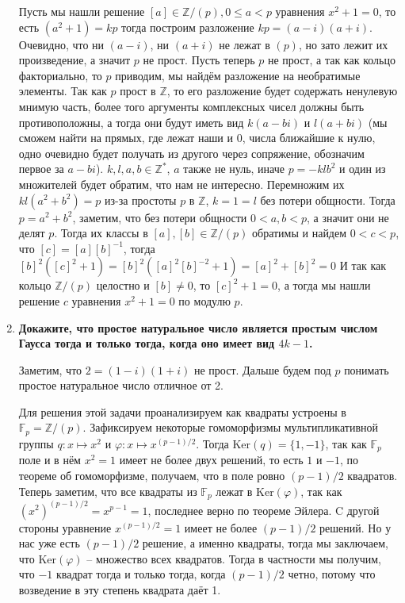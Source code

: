 \documentclass{article}
\begin{document}
\begin{enumerate}
        Пусть мы нашли решение $[a]\in\mathbb{Z}/(p),0\leq a<p$ уравнения
        $x^2+1=0$, то есть $(a^2+1)=kp$ тогда построим разложение
        $kp=(a-i)(a+i)$. Очевидно, что ни $(a-i)$, ни $(a+i)$ не лежат в $(p)$,
        но зато лежит их произведение, а значит $p$ не прост. Пусть теперь $p$
        не прост, а так как кольцо факториально, то $p$ приводим, мы найдём разложение
        на необратимые элементы. Так как $p$
        прост в $\mathbb{Z}$, то его разложение будет содержать ненулевую мнимую
        часть, более того аргументы комплексных чисел должны быть противоположны,
        а тогда они будут иметь вид $k(a-bi)$ и $l(a+bi)$ (мы сможем найти
        на прямых, где лежат наши и 0, числа ближайшие к нулю, одно очевидно
        будет получать из другого через сопряжение, обозначим первое за $a-bi$).
        $k,l,a,b\in\mathbb{Z}^*$, $a$ также не нуль, иначе $p=-klb^2$ и один из
        множителей будет обратим, что нам не интересно. Перемножим их $kl(a^2+b^2)=p$
        из-за простоты $p$ в $\mathbb{Z}$, $k=1=l$ без потери общности. Тогда $p=a^2+b^2$, заметим,
        что без потери общности $0<a,b<p$, а значит они не делят $p$. Тогда их
        классы в $[a],[b]\in\mathbb{Z}/(p)$ обратимы и найдем $0<c<p$, что
        $[c]=[a][b]^{-1}$, тогда $[b]^2([c]^2+1)=[b]^2([a]^2[b]^{-2}+1)=[a]^2+[b]^2=0$
        И так как кольцо $\mathbb{Z}/(p)$ целостно и $[b]\neq0$, то $[c]^2+1=0$,
        а тогда мы нашли решение $c$ уравнения $x^2+1=0$ по модулю $p$.

    \item \textbf{Докажите, что простое натуральное число является простым числом
        Гаусса тогда и только тогда, когда оно имеет вид $4k−1$.}

        Заметим, что $2=(1-i)(1+i)$ не прост. Дальше будем под $p$ понимать
        простое натуральное число отличное от 2.

        Для решения этой задачи проанализируем как квадраты устроены в 
        $\mathbb{F}_p=\mathbb{Z}/(p)$. Зафиксируем некоторые гомоморфизмы
        мультипликативной группы $q:x\mapsto x^2$ и $\varphi:x\mapsto x^{(p-1)/2}$.
        Тогда $\text{Ker}(q)=\{1,-1\}$, так как $\mathbb{F}_p$ поле и в нём
        $x^2=1$ имеет не более двух решений, то есть $1$ и $-1$, по теореме об
        гомоморфизме, получаем, что в поле ровно $(p-1)/2$ квадратов. Теперь
        заметим, что все квадраты из $\mathbb{F}_p$ лежат в
        $\text{Ker}(\varphi)$, так как $(x^2)^{(p-1)/2}=x^{p-1}=1$,
        последнее верно по теореме Эйлера. C другой стороны уравнение
        $x^{(p-1)/2}=1$ имеет не более $(p-1)/2$ решений. Но у нас уже есть
        $(p-1)/2$ решение, а именно квадраты, тогда мы заключаем, что $\text{Ker}
        (\varphi)$ – множество всех квадратов. Тогда в частности мы получим, что
        $-1$ квадрат тогда и только тогда, когда $(p-1)/2$ четно, потому что
        возведение в эту степень квадрата даёт 1.


\end{enumerate}
\end{document}
